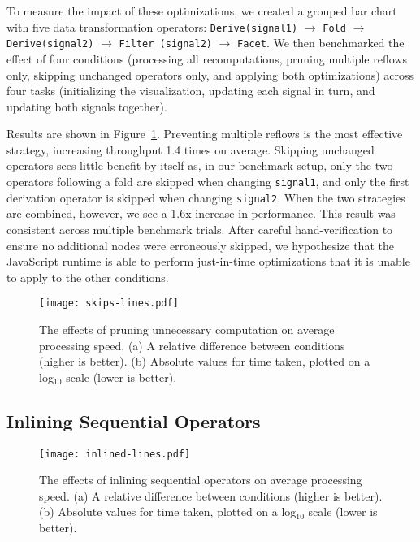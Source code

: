 To measure the impact of these optimizations, we created a grouped bar chart
with five data transformation operators: \texttt{Derive(signal1)} $\rightarrow$
\texttt{Fold} $\rightarrow$ \texttt{Derive(signal2)} $\rightarrow$
\texttt{Filter (signal2)} $\rightarrow$ \texttt{Facet}.  We then benchmarked the
effect of four conditions (processing all recomputations, pruning multiple
reflows only, skipping unchanged operators only, and applying both
optimizations) across four tasks (initializing the visualization, updating each
signal in turn, and updating both signals together).

Results are shown in Figure~\ref{fig:vg:skips_benchmark}. Preventing multiple
reflows is the most effective strategy, increasing throughput 1.4 times on
average. Skipping unchanged operators sees little benefit by itself as, in our
benchmark setup, only the two operators following a fold are skipped when
changing \texttt{signal1}, and only the first derivation operator is skipped
when changing \texttt{signal2}. When the two strategies are combined, however,
we see a 1.6x increase in performance. This result was consistent across
multiple benchmark trials. After careful hand-verification to ensure no
additional nodes were erroneously skipped, we hypothesize that the JavaScript
runtime is able to perform just-in-time optimizations that it is unable to apply
to the other conditions.

\begin{figure}[b!]
  \centering
  \texttt{[image: skips-lines.pdf]}
  \caption{The effects of pruning unnecessary computation on average processing
speed. (a) A relative difference between conditions (higher is better). (b)
Absolute values for time taken, plotted on a log$_{10}$ scale (lower is better).}
  \label{fig:vg:skips_benchmark}
\end{figure}

\subsection{Inlining Sequential Operators}

\begin{figure}[h!]
  \centering
  \texttt{[image: inlined-lines.pdf]}
  \caption{The effects of inlining sequential operators on average processing
speed. (a) A relative difference between conditions (higher is better). (b)
Absolute values for time taken, plotted on a log$_{10}$ scale (lower is better).}
  \label{fig:vg:inline_benchmark}
\end{figure}


